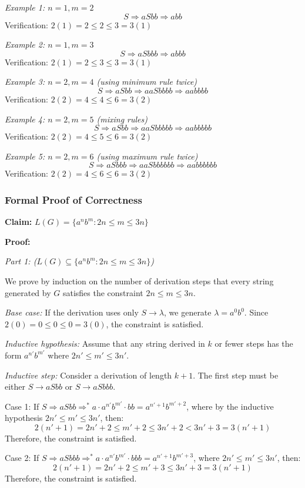 \documentclass[12pt]{article}
\begin{document}
\textit{Example 1: $n=1, m=2$}
$$S \Rightarrow aSbb \Rightarrow abb$$
Verification: $2(1) = 2 \le 2 \le 3 = 3(1)$ \checkmark

\textit{Example 2: $n=1, m=3$}
$$S \Rightarrow aSbbb \Rightarrow abbb$$
Verification: $2(1) = 2 \le 3 \le 3 = 3(1)$ \checkmark

\textit{Example 3: $n=2, m=4$ (using minimum rule twice)}
$$S \Rightarrow aSbb \Rightarrow aaSbbbb \Rightarrow aabbbb$$
Verification: $2(2) = 4 \le 4 \le 6 = 3(2)$ \checkmark

\textit{Example 4: $n=2, m=5$ (mixing rules)}
$$S \Rightarrow aSbb \Rightarrow aaSbbbbb \Rightarrow aabbbbb$$
Verification: $2(2) = 4 \le 5 \le 6 = 3(2)$ \checkmark

\textit{Example 5: $n=2, m=6$ (using maximum rule twice)}
$$S \Rightarrow aSbbb \Rightarrow aaSbbbbbb \Rightarrow aabbbbbb$$
Verification: $2(2) = 4 \le 6 \le 6 = 3(2)$ \checkmark

\subsubsection{Formal Proof of Correctness}

\textbf{Claim:} $L(G) = \{a^n b^m : 2n \le m \le 3n\}$

\textbf{Proof:}

\textit{Part 1: ($L(G) \subseteq \{a^n b^m : 2n \le m \le 3n\}$)}

We prove by induction on the number of derivation steps that every string generated by $G$ satisfies the constraint $2n \le m \le 3n$.

\textit{Base case:} If the derivation uses only $S \rightarrow \lambda$, we generate $\lambda = a^0 b^0$. Since $2(0) = 0 \le 0 \le 0 = 3(0)$, the constraint is satisfied.

\textit{Inductive hypothesis:} Assume that any string derived in $k$ or fewer steps has the form $a^{n'} b^{m'}$ where $2n' \le m' \le 3n'$.

\textit{Inductive step:} Consider a derivation of length $k+1$. The first step must be either $S \rightarrow aSbb$ or $S \rightarrow aSbbb$.

Case 1: If $S \Rightarrow aSbb \Rightarrow^* a \cdot a^{n'} b^{m'} \cdot bb = a^{n'+1} b^{m'+2}$, where by the inductive hypothesis $2n' \le m' \le 3n'$, then:
$$2(n'+1) = 2n' + 2 \le m' + 2 \le 3n' + 2 < 3n' + 3 = 3(n'+1)$$
Therefore, the constraint is satisfied.

Case 2: If $S \Rightarrow aSbbb \Rightarrow^* a \cdot a^{n'} b^{m'} \cdot bbb = a^{n'+1} b^{m'+3}$, where $2n' \le m' \le 3n'$, then:
$$2(n'+1) = 2n' + 2 \le m' + 3 \le 3n' + 3 = 3(n'+1)$$
Therefore, the constraint is satisfied.
\end{document}
